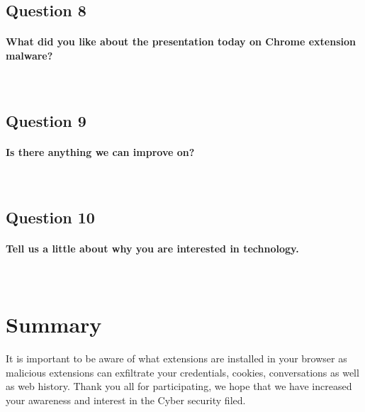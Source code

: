 \documentclass{article}
\newcommand\tab[1][0.5cm]{\hspace*{#1}}
\begin{document}
\subsection{Question 8}
\paragraph{What did you like about the presentation today on Chrome extension malware?}\mbox{}\\
\newline
\framebox[\textwidth]{\rule{0pt}{80pt}}

\subsection{Question 9}
\paragraph{Is there anything we can improve on?}\mbox{}\\
\newline
\framebox[\textwidth]{\rule{0pt}{80pt}}

\pagebreak

\subsection{Question 10}
\paragraph{Tell us a little about why you are interested in technology.}\mbox{}\\
\newline
\framebox[\textwidth]{\rule{0pt}{80pt}}

\pagebreak

\section{Summary}
\tab It is important to be aware of what extensions are installed in your browser as malicious extensions can exfiltrate your credentials, cookies, conversations as well as web history. Thank you all for participating, we hope that we have increased your awareness and interest in the Cyber security filed.
\end{document}
